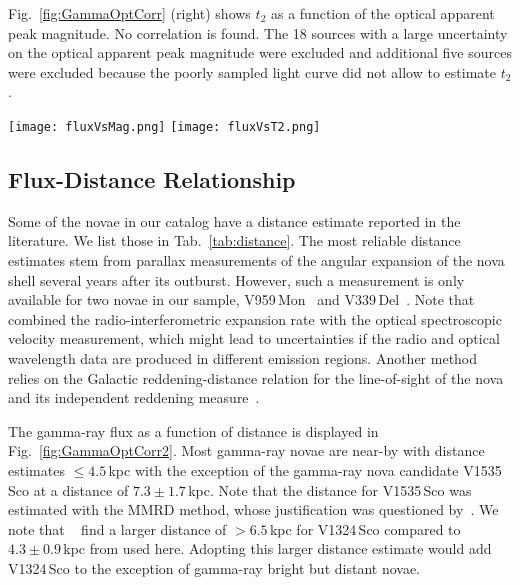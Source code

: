 \documentclass{aa} %
\begin{document}
Fig.~\ref{fig:GammaOptCorr} (right) shows $t_2$ as a function of the optical apparent peak magnitude. No correlation is found. The 18 sources with a large uncertainty on the optical apparent peak magnitude were excluded and additional five sources were excluded because the poorly sampled light curve did not allow to estimate $t_2$.

\begin{figure*}[htb!]
\begin{center}
\texttt{[image: fluxVsMag.png]}
\texttt{[image: fluxVsT2.png]}
\noindent
\caption{\small Correlation of the gamma-ray flux with the optical peak apparent magnitude (left) and $t_2$ (right): Sources with $TS>14.5$ (corresponding to $3\sigma$) are shown as blue circles, while already known gamma-ray novae are indicated as stars. Note that V959\,Mon is not included, because the peak was not covered by optical observations. Less significant sources are shown as upper limits indicated by arrows. The peak magnitude is measured in V-band for most cases (shown in blue), but for a few cases only I-band data was available (shown in green).}
\label{fig:GammaOptCorr}
\end{center}
\end{figure*}

\subsection{Flux-Distance Relationship}
Some of the novae in our catalog have a distance estimate reported in the literature. We list those in Tab.~\ref{tab:distance}. The most reliable distance estimates stem from parallax measurements of the angular expansion of the nova shell several years after its outburst. However, such a measurement is only available for two novae in our sample, V959\,Mon~\citep{Linford} and V339\,Del~\citep{2014Natur.515..234S}. Note that \citet{Linford} combined the radio-interferometric expansion rate with the optical spectroscopic velocity measurement, which might lead to uncertainties if the radio and optical wavelength data are produced in different emission regions. Another method relies on the Galactic reddening-distance relation for the line-of-sight of the nova and its independent reddening measure~\citep{Oezdoenmez}.

The gamma-ray flux as a function of distance is displayed in Fig.~\ref{fig:GammaOptCorr2}. Most gamma-ray novae are near-by with distance estimates $\le 4.5$\,kpc with the exception of the gamma-ray nova candidate V1535\,Sco at a distance of $7.3\pm1.7$\,kpc. Note that the distance for V1535\,Sco was estimated with the MMRD method, whose justification was questioned by~\citet{2011ApJ...735...94K}. We note that ~\citet{2015ApJ...809..160F} find a larger distance of $>6.5$\,kpc for V1324\,Sco compared to $4.3\pm0.9$\,kpc from \citet{Oezdoenmez} used here. Adopting this larger distance estimate would add V1324\,Sco to the exception of gamma-ray bright but distant novae.
\end{document}

